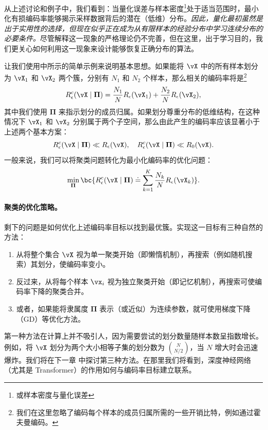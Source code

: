 \documentclass[../../book-main_zh.tex]{subfiles}
\begin{document}
从上述讨论和例子中，我们看到：当量化误差与样本密度\footnote{或样本密度与量化误差}处于适当范围时，最小化有损编码率能够揭示采样数据背后的潜在（低维）分布。{\em 因此，量化最初虽然是出于实用性的选择，但现在似乎正在成为从有限样本的经验分布中学习连续分布的必要条件。}尽管解释这一现象的严格理论仍不完善，但在这里，出于学习目的，我们更关心如何利用这一现象来设计能够恢复正确分布的算法。

让我们使用中所示的简单示例来说明基本思想。如果能将 $\vX$ 中的所有样本划分为 $\vX_1$ 和 $\vX_2$ 两个簇，分别有 $N_1$ 和 $N_2$ 个样本，那么相关的编码率将是\footnote{我们在这里忽略了编码每个样本的成员归属所需的一些开销比特，例如通过霍夫曼编码。}
\begin{equation}
    R_{\epsilon}^c(\vX\mid \boldsymbol{\Pi}) =
    \frac{N_1}{N}R_{\epsilon}(\vX_1) + \frac{N_2}{N}R_{\epsilon}(\vX_2),
\end{equation}
其中我们使用 $\boldsymbol{\Pi}$ 来指示划分的成员归属。如果划分尊重分布的低维结构，在这种情况下 $\vX_1$ 和 $\vX_2$ 分别属于两个子空间，那么由此产生的编码率应该显著小于上述两个基本方案：
\begin{equation}
    R_{\epsilon}^c(\vX \mid \boldsymbol{\Pi}) \ll R_{\epsilon}(\vX),
    \quad     R_{\epsilon}^c(\vX \mid \boldsymbol{\Pi}) \ll R_0(\vX).
\end{equation}
一般来说，我们可以将聚类问题转化为最小化编码率的优化问题：
\begin{equation}
    \min_{\boldsymbol{\Pi}}  \bc{ R_{\epsilon}^c(\vX \mid \boldsymbol{\Pi})
    \doteq \sum_{k=1}^K \frac{N_k}{N}R_{\epsilon}(\vX_k)}.
\end{equation}

\paragraph{聚类的优化策略。}
剩下的问题是如何优化上述编码率目标以找到最优簇。实现这一目标有三种自然的方法：
\begin{enumerate}
    \item 从将整个集合 $\vX$ 视为单一聚类开始（即懒惰机制），再搜索（例如随机搜索）其划分，使编码率变小。
    \item 反过来，从将每个样本 $\vx_i$ 视为独立聚类开始（即记忆机制），再搜索可使编码率下降的聚类合并。
    \item 或者，如果能将隶属度 $\boldsymbol{\Pi}$ 表示（或近似）为连续参数，就可使用梯度下降（GD）等优化方法。
\end{enumerate}
第一种方法在计算上并不吸引人，因为需要尝试的划分数量随样本数呈指数增长。例如，将 $\vX$ 划分为两个大小相等子集的划分数为 $N \choose N/2$，当 $N$ 增大时会迅速爆炸。我们将在下一章  中探讨第三种方法。在那里我们将看到，深度神经网络（尤其是 Transformer）的作用如何与编码率目标建立联系。
\end{document}
